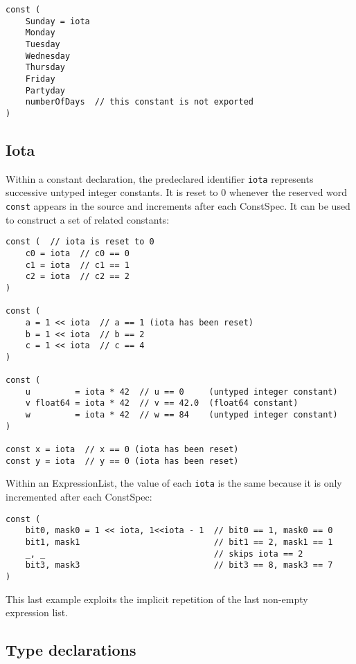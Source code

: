{\begin{Verbatim}[frame=single]
const (
    Sunday = iota
    Monday
    Tuesday
    Wednesday
    Thursday
    Friday
    Partyday
    numberOfDays  // this constant is not exported
)
\end{Verbatim}

\subsection*{Iota}

Within a constant declaration, the
predeclared identifier \texttt{iota} represents successive untyped
integer constants. It is reset to 0 whenever the
reserved word \texttt{const} appears in the source and increments after
each ConstSpec. It can be used to construct a set
of related constants:

\begin{Verbatim}[frame=single]
const (  // iota is reset to 0
    c0 = iota  // c0 == 0
    c1 = iota  // c1 == 1
    c2 = iota  // c2 == 2
)

const (
    a = 1 << iota  // a == 1 (iota has been reset)
    b = 1 << iota  // b == 2
    c = 1 << iota  // c == 4
)

const (
    u         = iota * 42  // u == 0     (untyped integer constant)
    v float64 = iota * 42  // v == 42.0  (float64 constant)
    w         = iota * 42  // w == 84    (untyped integer constant)
)

const x = iota  // x == 0 (iota has been reset)
const y = iota  // y == 0 (iota has been reset)
\end{Verbatim}

Within an ExpressionList, the value of each \texttt{iota} is the same
because it is only incremented after each ConstSpec:

\begin{Verbatim}[frame=single]
const (
    bit0, mask0 = 1 << iota, 1<<iota - 1  // bit0 == 1, mask0 == 0
    bit1, mask1                           // bit1 == 2, mask1 == 1
    _, _                                  // skips iota == 2
    bit3, mask3                           // bit3 == 8, mask3 == 7
)
\end{Verbatim}

This last example exploits the implicit repetition of the last non-empty
expression list.

\subsection*{Type declarations}

}
